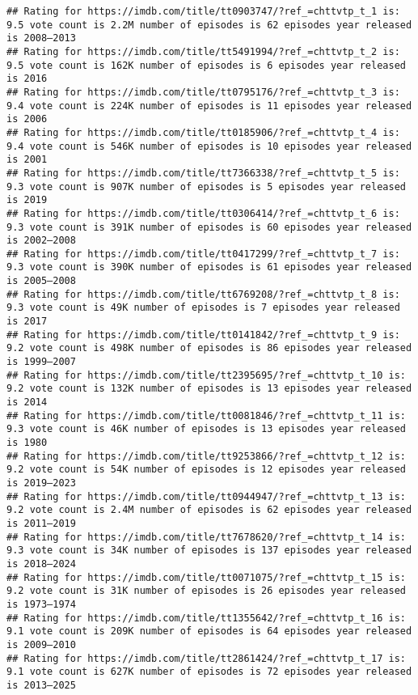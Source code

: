 \documentclass[
]{article}
\begin{document}
\begin{verbatim}
## Rating for https://imdb.com/title/tt0903747/?ref_=chttvtp_t_1 is: 9.5 vote count is 2.2M number of episodes is 62 episodes year released is 2008–2013 
## Rating for https://imdb.com/title/tt5491994/?ref_=chttvtp_t_2 is: 9.5 vote count is 162K number of episodes is 6 episodes year released is 2016 
## Rating for https://imdb.com/title/tt0795176/?ref_=chttvtp_t_3 is: 9.4 vote count is 224K number of episodes is 11 episodes year released is 2006 
## Rating for https://imdb.com/title/tt0185906/?ref_=chttvtp_t_4 is: 9.4 vote count is 546K number of episodes is 10 episodes year released is 2001 
## Rating for https://imdb.com/title/tt7366338/?ref_=chttvtp_t_5 is: 9.3 vote count is 907K number of episodes is 5 episodes year released is 2019 
## Rating for https://imdb.com/title/tt0306414/?ref_=chttvtp_t_6 is: 9.3 vote count is 391K number of episodes is 60 episodes year released is 2002–2008 
## Rating for https://imdb.com/title/tt0417299/?ref_=chttvtp_t_7 is: 9.3 vote count is 390K number of episodes is 61 episodes year released is 2005–2008 
## Rating for https://imdb.com/title/tt6769208/?ref_=chttvtp_t_8 is: 9.3 vote count is 49K number of episodes is 7 episodes year released is 2017 
## Rating for https://imdb.com/title/tt0141842/?ref_=chttvtp_t_9 is: 9.2 vote count is 498K number of episodes is 86 episodes year released is 1999–2007 
## Rating for https://imdb.com/title/tt2395695/?ref_=chttvtp_t_10 is: 9.2 vote count is 132K number of episodes is 13 episodes year released is 2014 
## Rating for https://imdb.com/title/tt0081846/?ref_=chttvtp_t_11 is: 9.3 vote count is 46K number of episodes is 13 episodes year released is 1980 
## Rating for https://imdb.com/title/tt9253866/?ref_=chttvtp_t_12 is: 9.2 vote count is 54K number of episodes is 12 episodes year released is 2019–2023 
## Rating for https://imdb.com/title/tt0944947/?ref_=chttvtp_t_13 is: 9.2 vote count is 2.4M number of episodes is 62 episodes year released is 2011–2019 
## Rating for https://imdb.com/title/tt7678620/?ref_=chttvtp_t_14 is: 9.3 vote count is 34K number of episodes is 137 episodes year released is 2018–2024 
## Rating for https://imdb.com/title/tt0071075/?ref_=chttvtp_t_15 is: 9.2 vote count is 31K number of episodes is 26 episodes year released is 1973–1974 
## Rating for https://imdb.com/title/tt1355642/?ref_=chttvtp_t_16 is: 9.1 vote count is 209K number of episodes is 64 episodes year released is 2009–2010 
## Rating for https://imdb.com/title/tt2861424/?ref_=chttvtp_t_17 is: 9.1 vote count is 627K number of episodes is 72 episodes year released is 2013–2025 

\end{verbatim}
\end{document}
